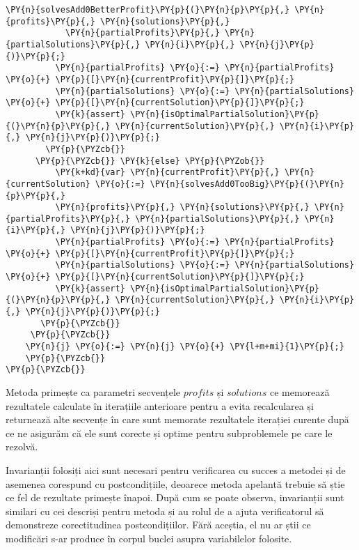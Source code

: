 \begin{sloppypar}
\begin{Verbatim}[commandchars=\\\{\}]
            \PY{n}{solvesAdd0BetterProfit}\PY{p}{(}\PY{n}{p}\PY{p}{,} \PY{n}{profits}\PY{p}{,} \PY{n}{solutions}\PY{p}{,} 
            \PY{n}{partialProfits}\PY{p}{,} \PY{n}{partialSolutions}\PY{p}{,} \PY{n}{i}\PY{p}{,} \PY{n}{j}\PY{p}{)}\PY{p}{;}
          \PY{n}{partialProfits} \PY{o}{:=} \PY{n}{partialProfits} \PY{o}{+} \PY{p}{[}\PY{n}{currentProfit}\PY{p}{]}\PY{p}{;}
          \PY{n}{partialSolutions} \PY{o}{:=} \PY{n}{partialSolutions} \PY{o}{+} \PY{p}{[}\PY{n}{currentSolution}\PY{p}{]}\PY{p}{;}
          \PY{k}{assert} \PY{n}{isOptimalPartialSolution}\PY{p}{(}\PY{n}{p}\PY{p}{,} \PY{n}{currentSolution}\PY{p}{,} \PY{n}{i}\PY{p}{,} \PY{n}{j}\PY{p}{)}\PY{p}{;}
        \PY{p}{\PYZcb{}}
      \PY{p}{\PYZcb{}} \PY{k}{else} \PY{p}{\PYZob{}}
          \PY{k+kd}{var} \PY{n}{currentProfit}\PY{p}{,} \PY{n}{currentSolution} \PY{o}{:=} \PY{n}{solvesAdd0TooBig}\PY{p}{(}\PY{n}{p}\PY{p}{,} 
          \PY{n}{profits}\PY{p}{,} \PY{n}{solutions}\PY{p}{,} \PY{n}{partialProfits}\PY{p}{,} \PY{n}{partialSolutions}\PY{p}{,} \PY{n}{i}\PY{p}{,} \PY{n}{j}\PY{p}{)}\PY{p}{;}
          \PY{n}{partialProfits} \PY{o}{:=} \PY{n}{partialProfits} \PY{o}{+} \PY{p}{[}\PY{n}{currentProfit}\PY{p}{]}\PY{p}{;}
          \PY{n}{partialSolutions} \PY{o}{:=} \PY{n}{partialSolutions} \PY{o}{+} \PY{p}{[}\PY{n}{currentSolution}\PY{p}{]}\PY{p}{;}
          \PY{k}{assert} \PY{n}{isOptimalPartialSolution}\PY{p}{(}\PY{n}{p}\PY{p}{,} \PY{n}{currentSolution}\PY{p}{,} \PY{n}{i}\PY{p}{,} \PY{n}{j}\PY{p}{)}\PY{p}{;}
       \PY{p}{\PYZcb{}}
     \PY{p}{\PYZcb{}}
    \PY{n}{j} \PY{o}{:=} \PY{n}{j} \PY{o}{+} \PY{l+m+mi}{1}\PY{p}{;}
    \PY{p}{\PYZcb{}}
\PY{p}{\PYZcb{}}
\end{Verbatim} 
    \par Metoda primește ca parametri secvențele $profits$ și $solutions$ ce memorează rezultatele calculate în iterațiile anterioare pentru a evita recalcularea și returnează alte secvențe în care sunt memorate rezultatele iterației curente după ce ne asigurăm că ele sunt corecte și optime pentru subproblemele pe care le rezolvă. \par
    Invarianții folosiți aici sunt necesari pentru verificarea cu succes a metodei și de asemenea corespund cu postcondițiile, deoarece metoda apelantă  trebuie să știe ce fel de rezultate primește înapoi. După cum se poate observa, invarianții sunt similari cu cei descriși pentru metoda  și au rolul de a ajuta verificatorul să demonstreze corectitudinea postcondițiilor. Fără aceștia, el nu ar știi ce modificări s-ar produce în corpul buclei asupra variabilelor folosite. \par

\end{sloppypar}
